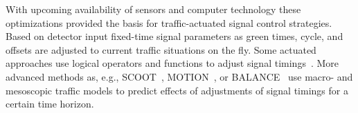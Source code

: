With upcoming availability of sensors and computer technology these optimizations provided the basis for traffic-actuated signal control strategies. 
Based on detector input fixed-time signal parameters as green times, cycle, and offsets are adjusted to current traffic situations on the fly. 
Some actuated approaches use logical operators and functions to adjust signal timings~\citep{Friedrich2002VerkehrsadaptiveLSASteuerung}. More advanced methods as, e.g., SCOOT~\citep{HuntEtc1981SCOOT,RobertsonBretherton1991ScootMethod,BrethertonBodgerBaber2004ScootFuture}, MOTION~\citep{BielefeldtBusch1994MOTION,BuschKruse2001MotionSITRAFFIC,BrilonEtAl2009MotionMuenster}, or BALANCE~\citep{GEVAS2011Balance,BraunEtAl2009TravolutionLSA2CarCommunication} use macro- and mesoscopic traffic models to predict effects of adjustments of signal timings for a certain time horizon.  
%

